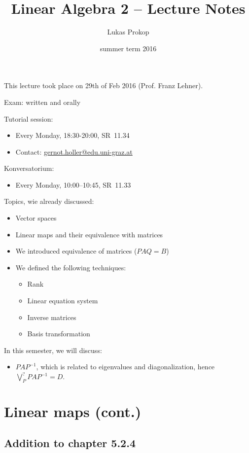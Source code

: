 \documentclass[a4paper,landscape,twocolumn]{article}
\title{Linear Algebra 2 -- Lecture Notes}
\author{Lukas Prokop}
\date{summer term 2016}
\newcommand\meta[3]{This #1 took place on #2 (#3).\par}
\theoremstyle{definition}
\begin{document}
\maketitle
\tableofcontents
\meta{lecture}{29th of Feb 2016}{Prof. Franz Lehner}

Exam: written and orally

Tutorial session:
\begin{itemize}
  \item Every Monday, 18:30-20:00, SR~11.34
  \item Contact: \href{mailto:gernot.holler@edu.uni-graz.at}{gernot.holler@edu.uni-graz.at}
\end{itemize}
Konversatorium:
\begin{itemize}
  \item Every Monday, 10:00--10:45, SR~11.33
\end{itemize}

Topics, wie already discussed:
\begin{itemize}
  \item Vector spaces
  \item Linear maps and their equivalence with matrices
  \item We introduced equivalence of matrices ($PAQ = B$)
  \item We defined the following techniques:
    \begin{itemize}
      \item Rank
      \item Linear equation system
      \item Inverse matrices
      \item Basis transformation
    \end{itemize}
\end{itemize}

In this semester, we will discuss:
\begin{itemize}
  \item
    $PAP^{-1}$, which is related to eigenvalues and diagonalization,
    hence $\bigvee_{P}^? PAP^{-1} = D$.
\end{itemize}

\clearpage
\section{Linear maps (cont.)}

\subsection[Addition to chapter 5.2.4]{Addition to chapter 5.2.4}
\end{document}
